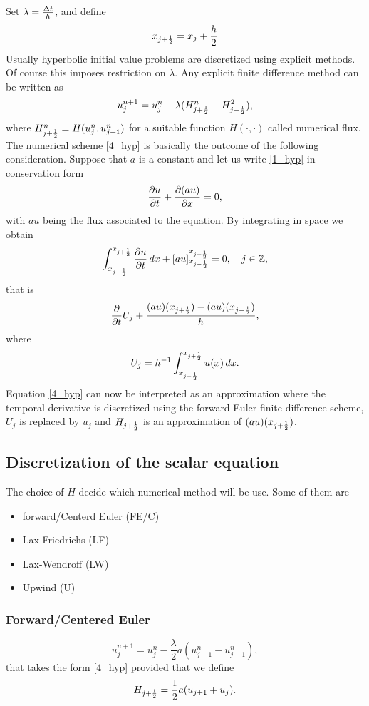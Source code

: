 Set \(\lambda = \frac{\Delta t}{h}\), and define 
\[
    x_{j+\frac{1}{2}} = x_j + \frac{h}{2}
\]
Usually hyperbolic initial value problems are discretized using explicit methods. Of course this imposes restriction on \(\lambda\). Any explicit finite difference method can be written as 
\begin{equation}
    u^{n+1}_j = u^n_j -\lambda(H^n_{j+\frac{1}{2}} - H^2_{j-\frac{1}{2}}),
    \label{4_hyp}
\end{equation}
where \(H^n_{j+\frac{1}{2}} = H(u_j^n, u^n_{j+1})\) for a suitable function \(H(\cdot, \cdot)\) called numerical flux.
The numerical scheme \eqref{4_hyp} is basically the outcome of the following consideration. Suppose that \(a\) is a constant and let us write \eqref{1_hyp} in conservation form 
\[
    \partialderivative{u}{t} + \partialderivative{(au)}{x} = 0,
\]
with \(au\) being the flux associated to the equation. By integrating in space we obtain 
\[
    \int_{x_{j-\onehalf}}^{x_{j+\onehalf}} \partialderivative{u}{t} \, dx + \left[ au \right]_{x_{j-\onehalf}}^{x_{j+\onehalf}} = 0, \quad j \in \mathbb{Z},
\]
that is 
\[
    \pderivative{t} U_j + \frac{(au)(x_{j+\onehalf}) - (au)(x_{j-\onehalf})}{h},
\]
where 
\[
    U_j = h^{-1} \int_{x_{j-\frac{1}{2}}}^{x_{j+\frac{1}{2}}} u(x) \, dx.
\]
Equation \eqref{4_hyp} can now be interpreted as an approximation where the temporal derivative is discretized using the forward Euler finite difference scheme, \(U_j\) is replaced by \(u_j\) and \(H_{j+\frac{1}{2}}\) is an approximation of \((au)(x_{j+\frac{1}{2}})\).
\subsection{Discretization of the scalar equation}
The choice of \(H\) decide which numerical method will be use. Some of them are 
\begin{itemize}
    \item forward/Centerd Euler (FE/C)
    \item Lax-Friedrichs (LF)
    \item Lax-Wendroff (LW)
    \item Upwind (U)
\end{itemize}
\subsubsection*{Forward/Centered Euler}
\begin{equation}
    u_j^{n+1} = u_j^n - \frac{\lambda}{2} a(u^n_{j+1} - u^n_{j-1}),
    \label{5_hyp}
\end{equation}
that takes the form \eqref{4_hyp} provided that we define 
\begin{equation}
    H_{j+\frac{1}{2}} = \frac{1}{2} a(u_{j+1} + u_j). 
    \label{6_hyp}
\end{equation}
